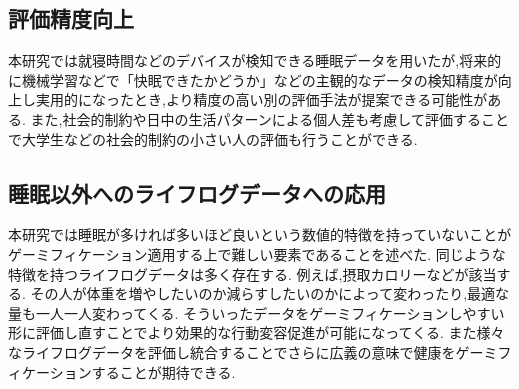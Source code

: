 \subsection{評価精度向上}
本研究では就寝時間などのデバイスが検知できる睡眠データを用いたが,将来的に機械学習などで「快眠できたかどうか」などの主観的なデータの検知精度が向上し実用的になったとき,より精度の高い別の評価手法が提案できる可能性がある.
また,社会的制約や日中の生活パターンによる個人差も考慮して評価することで大学生などの社会的制約の小さい人の評価も行うことができる.

\subsection{睡眠以外へのライフログデータへの応用}
本研究では睡眠が多ければ多いほど良いという数値的特徴を持っていないことがゲーミフィケーション適用する上で難しい要素であることを述べた.
同じような特徴を持つライフログデータは多く存在する.
例えば,摂取カロリーなどが該当する.
その人が体重を増やしたいのか減らすしたいのかによって変わったり,最適な量も一人一人変わってくる.
そういったデータをゲーミフィケーションしやすい形に評価し直すことでより効果的な行動変容促進が可能になってくる.
また様々なライフログデータを評価し統合することでさらに広義の意味で健康をゲーミフィケーションすることが期待できる.
